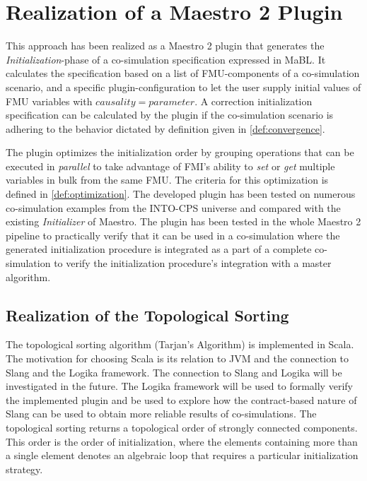 \section{Realization of a Maestro 2 Plugin}\label{sc:implementation}
This approach has been realized as a Maestro 2 plugin that generates the \textit{Initialization}-phase of a co-simulation specification expressed in MaBL. It calculates the specification based on a list of FMU-components of a co-simulation scenario, and a specific plugin-configuration to let the user supply initial values of FMU variables with $causality=parameter$. A correction initialization specification can be calculated by the plugin if the co-simulation scenario is adhering to the behavior dictated by definition given in \cref{def:convergence}.

The plugin optimizes the initialization order by grouping operations that can be executed in \textit{parallel} to take advantage of FMI's ability to \textit{set} or \textit{get} multiple variables in bulk from the same FMU. The criteria for this optimization is defined in \cref{def:optimization}. 
The developed plugin has been tested on numerous co-simulation examples from the INTO-CPS universe\cite{Maestro} and compared with the existing \textit{Initializer} of Maestro. The plugin has been tested in the whole Maestro 2 pipeline to practically verify that it can be used in a co-simulation where the generated initialization procedure is integrated as a part of a complete co-simulation to verify the initialization procedure's integration with a master algorithm.

\subsection{Realization of the Topological Sorting}
The topological sorting algorithm (Tarjan's Algorithm) is implemented in Scala. The motivation for choosing Scala is its relation to JVM and the connection to Slang and the Logika framework\cite{inbook}. The connection to Slang and Logika will be investigated in the future. The Logika framework will be used to formally verify the implemented plugin and be used to explore how the contract-based nature of Slang can be used to obtain more reliable results of co-simulations. The topological sorting returns a topological order of strongly connected components. This order is the order of initialization, where the elements containing more than a single element denotes an algebraic loop that requires a particular initialization strategy. 

